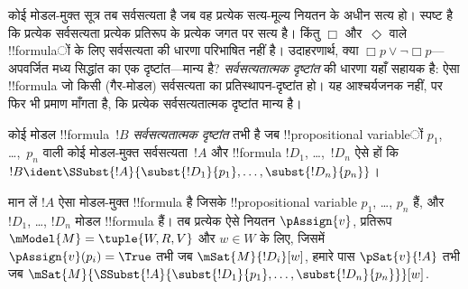 \documentclass[../../../include/open-logic-section]{subfiles}
\begin{document}


\begin{explain}
कोई मोडल-मुक्त सूत्र तब सर्वसत्यता है जब वह प्रत्येक सत्य-मूल्य नियतन के
अधीन सत्य हो। स्पष्ट है कि प्रत्येक सर्वसत्यता प्रत्येक प्रतिरूप के प्रत्येक
जगत पर सत्य है। किंतु $\Box$ और~$\Diamond$ वाले !!{formula}ों के लिए
सर्वसत्यता की धारणा परिभाषित नहीं है। उदाहरणार्थ, क्या
$\Box p \lor \lnot \Box p$---अपवर्जित मध्य सिद्धांत का एक दृष्टांत---मान्य
है? \emph{सर्वसत्यतात्मक दृष्टांत} की धारणा यहाँ सहायक है: ऐसा !!{formula} जो
किसी (गैर-मोडल) सर्वसत्यता का प्रतिस्थापन-दृष्टांत हो। यह आश्चर्यजनक नहीं,
पर फिर भी प्रमाण माँगता है, कि प्रत्येक सर्वसत्यतात्मक दृष्टांत मान्य है।
\end{explain}

\begin{defn}
  कोई मोडल !!{formula}~$!B$ \emph{सर्वसत्यतात्मक दृष्टांत} तभी है जब
  !!{propositional variable}ों $p_1$, \dots,~$p_n$ वाली कोई मोडल-मुक्त
  सर्वसत्यता~$!A$ और !!{formula} $!D_1$, \dots,~$!D_n$ ऐसे हों कि
  $!B \ident \SSubst{!A}{\subst{!D_1}{p_1},
    \dots, \subst{!D_n}{p_n}}$।
\end{defn}

\begin{lem}
  मान लें $!A$ ऐसा मोडल-मुक्त !!{formula} है जिसके !!{propositional variable}
  $p_1$, \dots, $p_n$ हैं, और $!D_1$, \dots, $!D_n$ मोडल !!{formula} हैं।
  तब प्रत्येक ऐसे नियतन $\pAssign{v}$, प्रतिरूप
  $\mModel{M} = \tuple{W, R, V}$ और $w \in W$ के लिए, जिसमें
  $\pAssign{v}(p_i) = \True$ तभी जब $\mSat{M}{!D_i}[w]$, हमारे पास
  $\pSat{v}{!A}$ तभी जब
  $\mSat{M}{\SSubst{!A}{\subst{!D_1}{p_1}, \dots,
      \subst{!D_n}{p_n}}}[w]$.
\end{lem}
\end{document}
